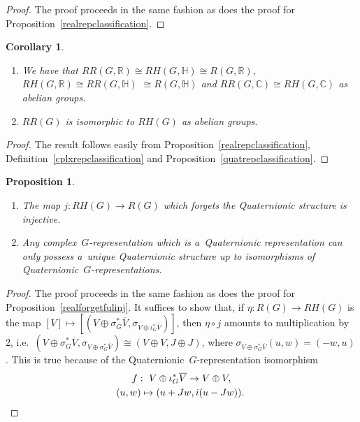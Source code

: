 \documentclass[11pt]{article}
\numberwithin{equation}{section}
\newtheorem{Corollary}[Theorem]{Corollary}
\newtheorem{Proposition}[Theorem]{Proposition}
{\theoremstyle{definition}
\newtheorem{Definition}[Theorem]{Definition}
\newtheorem{Example}[Theorem]{Example}
\newtheorem{Remark}[Theorem]{Remark}
}
\begin{document}
\begin{proof}
The proof proceeds in the same fashion as does the proof for Proposition~\ref{realrepclassification}.
\end{proof}
\begin{Corollary}\label{3by3table}\quad
\begin{enumerate}\itemsep=0pt
\item[$1.$]
We have that $RR(G, \mathbb{R})\cong RH(G, \mathbb{H})\cong R(G, \mathbb{R})$, $RH(G, \mathbb{R})\cong RR(G,\mathbb{H})$
$\cong R(G, \mathbb{H})$ and $RR(G, \mathbb{C})\cong RH(G, \mathbb{C})$ as abelian groups.
\item[$2.$]
$RR(G)$ is isomorphic to $RH(G)$ as abelian groups.
\end{enumerate}
\end{Corollary}

\begin{proof}
The result follows easily from Proposition~\ref{realrepclassification}, Def\/inition~\ref{cplxrepclassification} and
Proposition~\ref{quatrepclassification}.
\end{proof}
\begin{Proposition}\label{quatforgetfulinj}\quad
\begin{enumerate}\itemsep=0pt
\item[$1.$]
The map $j: RH(G)\to R(G)$ which forgets the Quaternionic structure is injective.
\item[$2.$]
Any complex~$G$-representation which is a~Quaternionic representation can only possess a~unique Quaternionic structure
up to isomorphisms of Quaternionic~$G$-representations.
\end{enumerate}
\end{Proposition}
\begin{proof}
The proof proceeds in the same fashion as does the proof for Proposition~\ref{realforgetfulinj}.
It suf\/f\/ices to show that, if $\eta: R(G)\to RH(G)$ is the map $[V]\mapsto [(V\oplus
\sigma_G^*\overline{V},
\sigma_{V\oplus\iota_G^*\overline{V}})]$, then $\eta\circ j$ amounts to multiplication by 2, i.e.\
$(V\oplus\sigma_G^*\overline{V},\sigma_{V\oplus\sigma_G^*\overline{V}})\cong(V\oplus V, J\oplus J)$, where $\sigma_{V\oplus\sigma_G^*\overline{V}}(u, w)=(-w, u)$.
This is true because of the Quaternionic~$G$-representation isomorphism
\begin{gather*}
f: \  V\oplus\iota_G^*\overline{V}  \to   V\oplus V,\\
\hphantom{f: {}}  \ (u, w) \mapsto  (u+Jw, i(u-Jw)). \tag*{\qed}
\end{gather*}
\renewcommand{\qed}{}
\end{proof}
\end{document}
